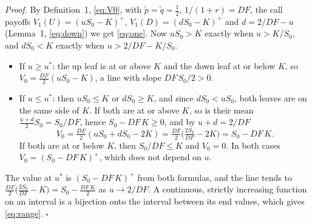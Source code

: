 \documentclass[11pt,a4paper]{article}
\begin{document}
\noindent\textit{Proof.} By Definition~1, \eqref{eq:V0}, with $\tilde p=\tilde q=\tfrac12$, $1/(1+r)=DF$, the call payoffs $V_1(U)=(uS_0-K)^+$, $V_1(D)=(dS_0-K)^+$ and $d=2/DF-u$ (Lemma~1, \eqref{eq:down}) we get \eqref{eq:one}. Now $uS_0>K$ exactly when $u>K/S_0$, and $dS_0<K$ exactly when $u>2/DF-K/S_0$.
\begin{itemize}
\item If $u\ge u^*$: the up leaf is at or above $K$ and the down leaf at or below $K$, so $V_0=\frac{DF}{2}(uS_0-K)$, a line with slope $DF\,S_0/2>0$.
\item If $u\le u^*$: then $uS_0\le K$ or $dS_0\ge K$, and since $dS_0<uS_0$, both leaves are on the same side of $K$. If both are at or above $K$, so is their mean $\frac{u+d}{2}S_0=S_0/DF$, hence $S_0-DF\,K\ge0$, and by $u+d=2/DF$
\[
V_0=\tfrac{DF}2(uS_0+dS_0-2K)=\tfrac{DF}{2}\bigl(\tfrac{2S_0}{DF}-2K\bigr)=S_0-DF\,K .
\]
If both are at or below $K$, then $S_0/DF\le K$ and $V_0=0$. In both cases $V_0=(S_0-DF\,K)^+$, which does not depend on $u$.
\end{itemize}
The value at $u^*$ is $(S_0-DF\,K)^+$ from both formulas, and the line tends to $\frac{DF}2\bigl(\frac{2S_0}{DF}-K\bigr)=S_0-\frac{DF\,K}2$ as $u\to2/DF$. A continuous, strictly increasing function on an interval is a bijection onto the interval between its end values, which gives \eqref{eq:range}. \hfill$\square$
\end{document}
